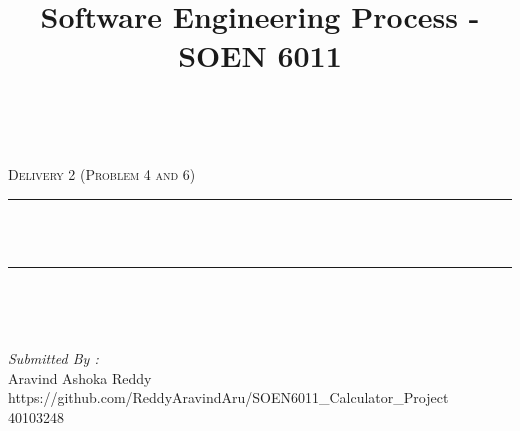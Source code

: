 \documentclass[12pt]{report}
\title{Software Engineering Process - SOEN 6011}
\author{ }
\date{}
\makeatletter
\let\thetitle\@title
\makeatother
\begin{document}

\begin{titlepage}
\centering
    \vspace*{0.5 cm}
\begin{center}    \textsc{\Large   }\\[2.0 cm]	\end{center}%
\textsc{\Large Delivery 2 (Problem 4 and 6)  }\\[0.5 cm]	%
\rule{\linewidth}{0.2 mm} \\[0.4 cm]
{ \huge \bfseries \thetitle}\\
\rule{\linewidth}{0.2 mm} \\[1.5 cm]

\begin{minipage}{0.4\textwidth}
\begin{center} \large
\end{center}
\end{minipage}~
\begin{center}{}
            
\begin{center} \large
\emph{Submitted By :} \\
{Aravind Ashoka Reddy } \\
{https://github.com/ReddyAravindAru/SOEN6011_Calculator_Project} \\
{40103248 }\\

\end{center}
           
\end{center}\\[2 cm]


    
    
    
    

\end{titlepage}


\tableofcontents
\pagebreak
\end{document}
